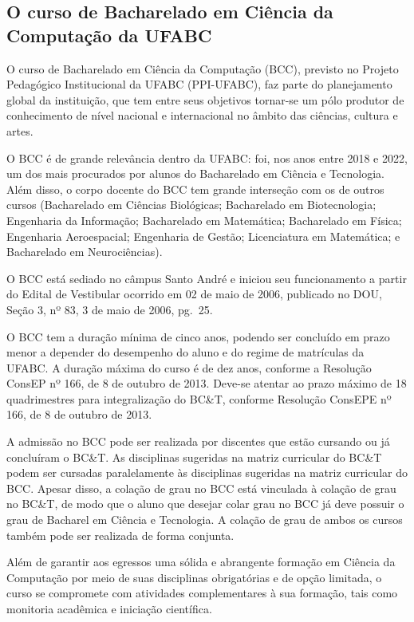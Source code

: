 \subsection{O curso de Bacharelado em Ciência da Computação da UFABC}

O curso de Bacharelado em Ciência da Computação (BCC), previsto no Projeto
Pedagógico Institucional da UFABC (PPI-UFABC), faz parte do planejamento global
da instituição, que tem entre seus objetivos tornar-se um pólo produtor de
conhecimento de nível nacional e internacional no âmbito das ciências, cultura
e artes.

O BCC é de grande relevância dentro da UFABC: foi, nos anos entre 2018
e 2022, um dos mais procurados por alunos do Bacharelado em Ciência e
Tecnologia. Além disso, o corpo docente do BCC tem grande interseção
com os de outros cursos (Bacharelado em Ciências Biológicas;
Bacharelado em Biotecnologia; Engenharia da Informação; Bacharelado em
Matemática; Bacharelado em Física; Engenharia Aeroespacial; Engenharia
de Gestão; Licenciatura em Matemática; e Bacharelado em Neurociências).

O BCC está sediado no câmpus Santo André e iniciou seu funcionamento a partir
do Edital de Vestibular ocorrido em 02 de maio de 2006, publicado no DOU,
Seção 3, nº 83, 3 de maio de 2006, pg.\ 25.

O BCC tem a duração mínima de cinco anos, podendo ser concluído em prazo menor
a depender do desempenho do aluno e do regime de matrículas da UFABC.
A duração máxima do curso é de dez anos, conforme a Resolução ConsEP nº 166,
de 8 de outubro de 2013.
Deve-se atentar ao prazo máximo de 18 quadrimestres para integralização do
BC\&T, conforme Resolução ConsEPE nº 166, de 8 de outubro de 2013.

A admissão no BCC pode ser realizada por discentes que estão cursando ou já
concluíram o BC\&T.
As disciplinas sugeridas na matriz curricular do BC\&T podem ser cursadas
paralelamente às disciplinas sugeridas na matriz curricular do BCC.
Apesar disso, a colação de grau no BCC está vinculada à colação de grau no
BC\&T, de modo que o aluno que desejar colar grau no BCC já deve possuir o grau
de Bacharel em Ciência e Tecnologia.
A colação de grau de ambos os cursos também pode ser realizada de forma conjunta.

Além de garantir aos egressos uma sólida e abrangente formação em Ciência da
Computação por meio de suas disciplinas obrigatórias e de opção limitada, o
curso se compromete com atividades complementares à sua formação, tais como
monitoria acadêmica e iniciação científica.

